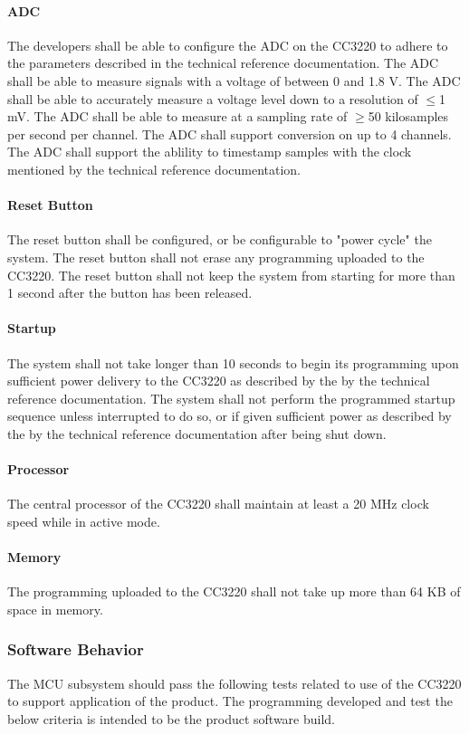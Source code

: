\paragraph{ADC} The developers shall be able to configure the ADC on the CC3220
to adhere to the parameters described in the technical reference documentation.
The ADC shall be able to measure signals with a voltage of between 0 and 1.8 V.
The ADC shall be able to accurately measure a voltage level down to a
resolution of $\leq$1 mV. The ADC shall be able to measure at a sampling rate
of $\geq$50 kilosamples per second per channel. The ADC shall support
conversion on up to 4 channels. The ADC shall support the ablility to timestamp
samples with the clock mentioned by the technical reference documentation.

\paragraph{Reset Button} The reset button shall be configured, or be
configurable to "power cycle" the system. The reset button shall not erase
any programming uploaded to the CC3220. The reset button shall not keep the
system from starting for more than 1 second after the button has been released.

\paragraph{Startup} The system shall not take longer than 10 seconds to begin
its programming upon sufficient power delivery to the CC3220 as described by
the by the technical reference documentation. The system shall not perform
the programmed startup sequence unless interrupted to do so, or if given
sufficient power as described by the by the technical reference documentation
after being shut down.

\paragraph{Processor} The central processor of the CC3220 shall maintain at
least a 20 MHz clock speed while in active mode.

\paragraph{Memory} The programming uploaded to the CC3220 shall not take up
more than 64 KB of space in memory.

\subsubsection{Software Behavior} The MCU subsystem should pass the following
tests related to use of the CC3220 to support application of the product. The
programming developed and test the below criteria is intended to be the
product software build.

